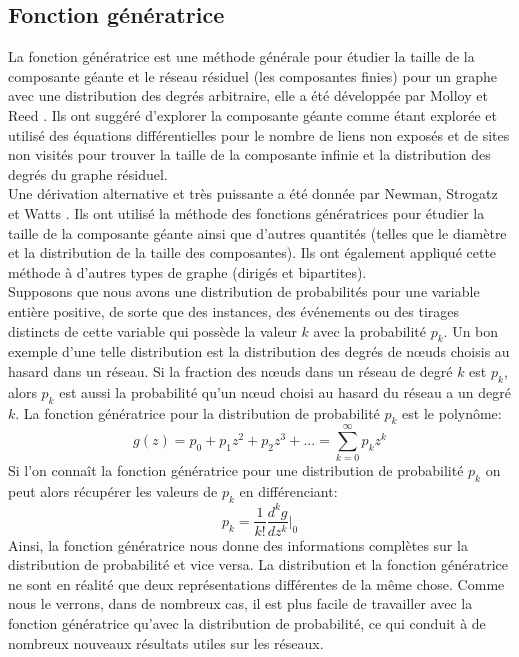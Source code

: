 \subsection{Fonction génératrice}
La fonction génératrice est une méthode générale pour étudier la taille de la composante géante et le réseau résiduel (les composantes finies) pour un graphe avec une distribution des degrés arbitraire, elle a été développée par Molloy et Reed \cite{Molloy-Reed1998}. Ils ont suggéré d'explorer la composante géante comme étant explorée et utilisé des équations différentielles pour le nombre de liens non exposés et de sites non visités pour trouver la taille de la composante infinie et la distribution des degrés du graphe résiduel.\\
Une dérivation alternative et très puissante a été donnée par Newman, Strogatz et Watts \cite{Newman-al2001}. Ils ont utilisé la méthode des fonctions génératrices pour étudier la taille de la composante géante ainsi que d'autres quantités (telles que le diamètre et la distribution de la taille des composantes). Ils ont également appliqué cette méthode à d'autres types de graphe (dirigés et bipartites).\\
Supposons que nous avons une distribution de  probabilités pour une variable entière positive, de sorte que des instances, des événements ou des tirages distincts de cette variable qui possède la valeur $k$ avec la probabilité $p_k$. Un bon exemple d'une telle distribution est la distribution des degrés de nœuds choisis au hasard dans un réseau. Si la fraction des nœuds dans un réseau de degré $k$ est $p_k$, alors $p_k$ est aussi la probabilité qu'un nœud choisi au hasard du réseau a un degré $k$. La fonction génératrice pour la distribution de probabilité $p_k$ est le polynôme:
\begin{equation}
g(z)=p_0+p_1z^2+p_2z^3+...=\sum_{k=0}^{\infty}p_kz^k
\end{equation}
Si l'on connaît la fonction génératrice pour une distribution de probabilité $p_k$ on peut alors récupérer les valeurs de $p_k$ en différenciant:
\begin{equation}
p_k=\frac{1}{k!}\frac{d^kg}{dz^k}\Big\lvert_0
\end{equation}
Ainsi, la fonction génératrice nous donne des informations complètes sur la distribution de probabilité et vice versa. La distribution et la fonction génératrice ne sont en réalité que deux représentations différentes de la même chose. Comme nous le verrons, dans de nombreux cas, il est plus facile de travailler avec la fonction génératrice qu'avec la distribution de probabilité, ce qui conduit à de nombreux nouveaux résultats utiles sur les réseaux.\\

